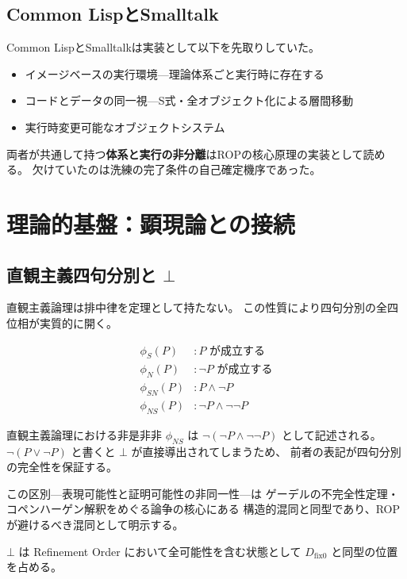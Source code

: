 \documentclass[11pt,a4paper]{article}
\theoremstyle{definition}
\newcommand{\dfix}{D_{\mathrm{fix}0}}
\begin{document}
\subsection{Common LispとSmalltalk}

Common LispとSmalltalkは実装として以下を先取りしていた。

\begin{itemize}
  \item イメージベースの実行環境---理論体系ごと実行時に存在する
  \item コードとデータの同一視---S式・全オブジェクト化による層間移動
  \item 実行時変更可能なオブジェクトシステム
\end{itemize}

両者が共通して持つ\textbf{体系と実行の非分離}はROPの核心原理の実装として読める。
欠けていたのは洗練の完了条件の自己確定機序であった。

\section{理論的基盤：顕現論との接続}

\subsection{直観主義四句分別と $\bot$}

直観主義論理は排中律を定理として持たない。
この性質により四句分別の全四位相が実質的に開く。

\begin{align}
\phi_S(P) &: P \text{ が成立する} \\
\phi_N(P) &: \neg P \text{ が成立する} \\
\phi_{SN}(P) &: P \wedge \neg P \\
\phi_{NS}(P) &: \neg P \wedge \neg\neg P
\end{align}

直観主義論理における非是非非 $\phi_{NS}$ は
$\neg(\neg P \wedge \neg\neg P)$ として記述される。
$\neg(P \vee \neg P)$ と書くと $\bot$ が直接導出されてしまうため、
前者の表記が四句分別の完全性を保証する。

この区別---表現可能性と証明可能性の非同一性---は
ゲーデルの不完全性定理・コペンハーゲン解釈をめぐる論争の核心にある
構造的混同と同型であり、ROPが避けるべき混同として明示する。

$\bot$ は Refinement Order において全可能性を含む状態として
$\dfix$ と同型の位置を占める。
\end{document}
